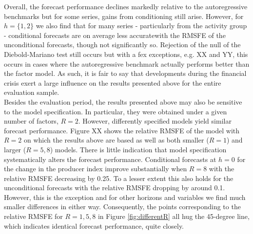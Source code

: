 \documentclass[notitlepage,a4paper,12pt]{article}
\begin{document}
Overall, the forecast performance declines markedly relative to the autoregressive benchmarks but for some series, gains from conditioning still arise. However, for $h=\{1,2\}$ we also find that for many series - particularly from the activity group - conditional forecasts are on average less accuratewith the RMSFE of the unconditional forecasts, though not significantly so. Rejection of the null of the Diebold-Mariano test still occurs but with a fex exceptions, e.g. XX and YY, this occurs in cases where the autoregressive benchmark actually performs better than the factor model. As such, it is fair to say that developments during the financial crisis exert a large influence on the results presented above for the entire evaluation sample.\\

Besides the evaluation period, the results presented above may also be sensitive to the model specification. In particular, they were obtained under a given number of factors, $R=2$. However, differently specified models yield similar forecast performance. Figure XX shows the relative RMSFE of the model with $R=2$ on which the results above are based as well as both smaller ($R=1$) and larger ($R = {5,8}$) models. There is little indication that model specification systematically alters the forecast performance. Conditional forecasts at $h=0$ for the change in the producer index improve substantially when $R=8$ with the relative RMSFE decreasing by 0.25. To a lesser extent this also holds for the unconditional forecasts with the relative RMSFE dropping by around 0.1. However, this is the exception and for other horizons and variables we find much smaller differences in either way. Consequently, the points corresponding to the relative RMSFE for $R={1, 5, 8}$ in Figure \ref{fig:differentR} all hug the 45-degree line, which indicates identical forecast performance, quite closely. 
\end{document}
